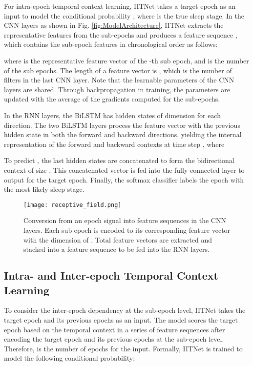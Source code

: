 \documentclass[10pt,twocolumn,twoside]{IEEEtran}
\begin{document}
    For intra-epoch temporal context learning, IITNet takes a target epoch  as an input to model the conditional probability , where  is the true sleep stage.  In the CNN layers as shown in Fig. \ref{fig:ModelArchitecture}, IITNet extracts the representative features  from the sub-epochs and produces a feature sequence , which contains the sub-epoch features in chronological order as follows:
    
    
    where  is the representative feature vector of the -th sub epoch, and  is the number of the sub epochs. The length of a feature vector is , which is the number of filters in the last CNN layer. Note that the learnable parameters of the CNN layers are shared. Through backpropagation in training, the parameters are updated with the average of the gradients computed for the sub-epochs. 
    
    In the RNN layers, the BiLSTM has hidden states of dimension  for each direction. The two BiLSTM layers process the feature vector with the previous hidden state in both the forward and backward directions, yielding the internal representation of the forward  and backward  contexts at time step , where \cite{graves2005framewise} 
    
    
    
    
    To predict , the last hidden states are concatenated to form the bidirectional context  of size . This concatenated vector is fed into the fully connected layer to output  for the target epoch. Finally, the softmax classifier labels the epoch with the most likely sleep stage.
    
    \begin{figure}
    \centering
     \texttt{[image: receptive\_field.png]}
     \caption{Conversion from an epoch signal into feature sequences in the CNN layers. Each sub epoch is encoded to its corresponding feature vector with the dimension of . Total  feature vectors are extracted and stacked into a feature sequence to be fed into the RNN layers.}
     \label{fig:receptive_field}
    \end{figure}
    
    

    \subsection{Intra- and Inter-epoch Temporal Context Learning}
    \label{Intra- and Inter-epoch Temporal Context Learning}

    To consider the inter-epoch dependency at the sub-epoch level, IITNet takes the target epoch and its previous epochs as an input. The model scores the target epoch based on the temporal context in a series of feature sequences after encoding the target epoch and its previous  epochs at the sub-epoch level. Therefore,  is the number of epochs for the input. Formally, IITNet is trained to model the following conditional probability:
    
\end{document}
